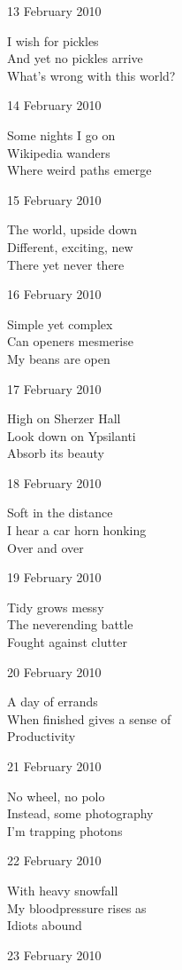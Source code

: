 \documentclass[12pt]{article}
\begin{document}
13 February 2010

I wish for pickles \\
And yet no pickles arrive \\
What's wrong with this world?

14 February 2010

Some nights I go on \\
Wikipedia wanders \\
Where weird paths emerge

\newpage

15 February 2010

The world, upside down \\
Different, exciting, new \\
There yet never there

16 February 2010

Simple yet complex \\
Can openers mesmerise \\
My beans are open

17 February 2010

High on Sherzer Hall \\
Look down on Ypsilanti \\
Absorb its beauty

18 February 2010

Soft in the distance \\
I hear a car horn honking \\
Over and over

19 February 2010

Tidy grows messy \\
The neverending battle \\
Fought against clutter

20 February 2010

A day of errands \\
When finished gives a sense of \\
Productivity

21 February 2010

No wheel, no polo \\
Instead, some photography \\
I'm trapping photons

\newpage

22 February 2010

With heavy snowfall \\
My bloodpressure rises as  \\
Idiots abound

23 February 2010
\end{document}
